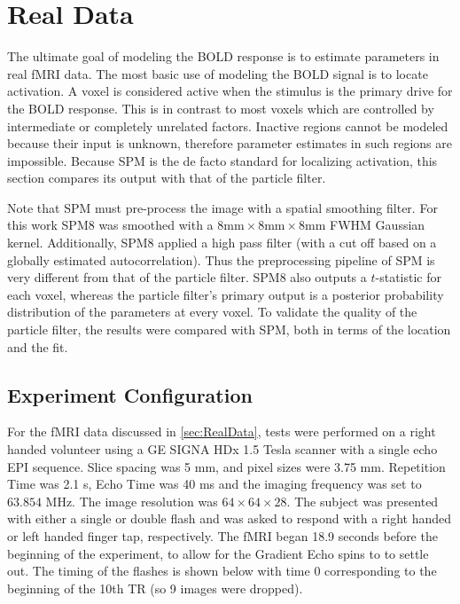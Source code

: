 \chapter{Real Data}
\label{sec:RealData}
The ultimate goal of modeling the \ac{BOLD} response is to estimate parameters
in real \ac{fMRI} data. The most basic use of modeling the \ac{BOLD} signal is to
locate activation. A voxel is considered active when the stimulus
is the primary drive for the \ac{BOLD} response. This is in contrast to
most voxels which are controlled by intermediate or completely unrelated factors.
Inactive regions cannot be modeled because their input is unknown, therefore
parameter estimates in such regions are impossible.
Because \ac{SPM} is the de facto standard for localizing activation,
this section compares its output with that of the particle filter.

Note that \ac{SPM} must pre-process the image with a spatial smoothing
filter. For this work SPM8 was smoothed with a
$8\text{mm} \times  8 \text{mm} \times 8\text{mm}$ 
\ac{FWHM} Gaussian kernel.
Additionally, SPM8 applied a high pass filter (with a cut
off based on a globally estimated autocorrelation). Thus the preprocessing pipeline
of \ac{SPM} is very different from that of the particle filter. SPM8 also outputs
a $t$-statistic for each voxel, whereas the
particle filter's primary output is a posterior probability distribution of the parameters
at every voxel. To validate the quality of the particle filter, the results
were compared with \ac{SPM}, both in terms of the location and the fit.

\section{Experiment Configuration}
\label{sec:ExperimentConfig}
For the \ac{fMRI} data discussed in \autoref{sec:RealData}, tests were
performed on a right handed volunteer using a GE SIGNA HDx 1.5 Tesla
scanner with a single echo \ac{EPI} sequence. Slice spacing was
5 mm, and pixel sizes were 3.75 mm.  Repetition Time was 2.1 s,
Echo Time was 40 ms and the imaging frequency was set to $63.854$ MHz.
The image resolution was $64 \times 64 \times 28$.
The subject was presented with either a single or
double flash and was asked to respond with a right handed
or left handed finger tap, respectively. The \ac{fMRI} began 18.9 seconds
before the beginning of the experiment, to allow for 
the Gradient Echo spins to to settle out. 
The timing of the flashes is shown
below with time 0 corresponding to the beginning of
the 10th \ac{TR} (so 9 images were dropped).

